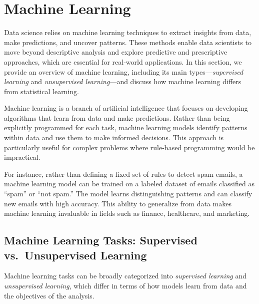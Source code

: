 \documentclass[
]{book}
\theoremstyle{definition}
\theoremstyle{definition}
\theoremstyle{definition}
\theoremstyle{definition}
\theoremstyle{remark}
\begin{document}
\section{Machine Learning}\label{machine-learning}

Data science relies on machine learning techniques to extract insights from data, make predictions, and uncover patterns. These methods enable data scientists to move beyond descriptive analysis and explore predictive and prescriptive approaches, which are essential for real-world applications. In this section, we provide an overview of machine learning, including its main types---\emph{supervised learning} and \emph{unsupervised learning}---and discuss how machine learning differs from statistical learning.

Machine learning is a branch of artificial intelligence that focuses on developing algorithms that learn from data and make predictions. Rather than being explicitly programmed for each task, machine learning models identify patterns within data and use them to make informed decisions. This approach is particularly useful for complex problems where rule-based programming would be impractical.

For instance, rather than defining a fixed set of rules to detect spam emails, a machine learning model can be trained on a labeled dataset of emails classified as ``spam'' or ``not spam.'' The model learns distinguishing patterns and can classify new emails with high accuracy. This ability to generalize from data makes machine learning invaluable in fields such as finance, healthcare, and marketing.

\subsection*{Machine Learning Tasks: Supervised vs.~Unsupervised Learning}\label{machine-learning-tasks-supervised-vs.-unsupervised-learning}

Machine learning tasks can be broadly categorized into \emph{supervised learning} and \emph{unsupervised learning}, which differ in terms of how models learn from data and the objectives of the analysis.
\end{document}
